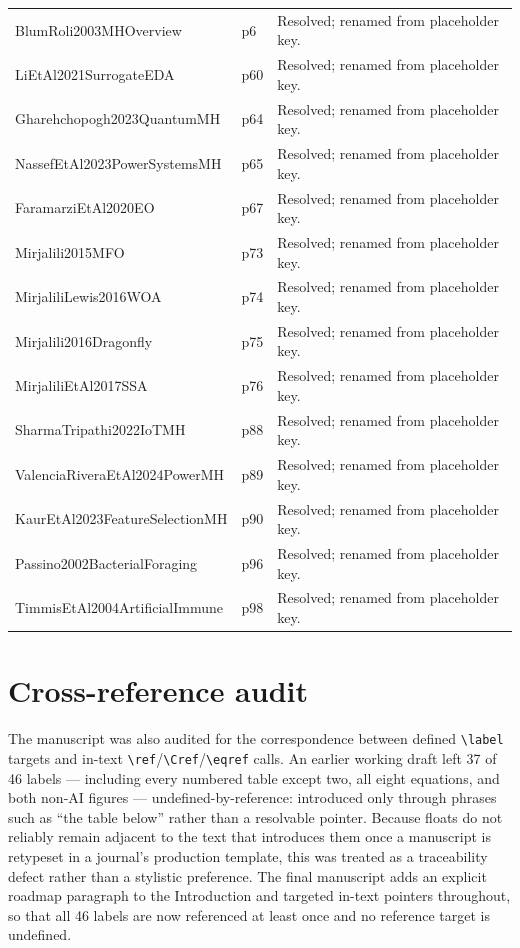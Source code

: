 \documentclass[9pt]{article}
\begin{document}
\begin{longtable}{P{5.4cm}P{4.0cm}P{4.4cm}}
BlumRoli2003MHOverview & p6 & Resolved; renamed from placeholder key. \\
LiEtAl2021SurrogateEDA & p60 & Resolved; renamed from placeholder key. \\
Gharehchopogh2023QuantumMH & p64 & Resolved; renamed from placeholder key. \\
NassefEtAl2023PowerSystemsMH & p65 & Resolved; renamed from placeholder key. \\
FaramarziEtAl2020EO & p67 & Resolved; renamed from placeholder key. \\
Mirjalili2015MFO & p73 & Resolved; renamed from placeholder key. \\
MirjaliliLewis2016WOA & p74 & Resolved; renamed from placeholder key. \\
Mirjalili2016Dragonfly & p75 & Resolved; renamed from placeholder key. \\
MirjaliliEtAl2017SSA & p76 & Resolved; renamed from placeholder key. \\
SharmaTripathi2022IoTMH & p88 & Resolved; renamed from placeholder key. \\
ValenciaRiveraEtAl2024PowerMH & p89 & Resolved; renamed from placeholder key. \\
KaurEtAl2023FeatureSelectionMH & p90 & Resolved; renamed from placeholder key. \\
Passino2002BacterialForaging & p96 & Resolved; renamed from placeholder key. \\
TimmisEtAl2004ArtificialImmune & p98 & Resolved; renamed from placeholder key. \\
\bottomrule\end{longtable}

\section*{Cross-reference audit}
The manuscript was also audited for the correspondence between defined \texttt{\textbackslash label} targets and in-text \texttt{\textbackslash ref}/\texttt{\textbackslash Cref}/\texttt{\textbackslash eqref} calls. An earlier working draft left 37 of 46 labels --- including every numbered table except two, all eight equations, and both non-AI figures --- undefined-by-reference: introduced only through phrases such as ``the table below'' rather than a resolvable pointer. Because floats do not reliably remain adjacent to the text that introduces them once a manuscript is retypeset in a journal's production template, this was treated as a traceability defect rather than a stylistic preference. The final manuscript adds an explicit roadmap paragraph to the Introduction and targeted in-text pointers throughout, so that all 46 labels are now referenced at least once and no reference target is undefined.
\end{document}
